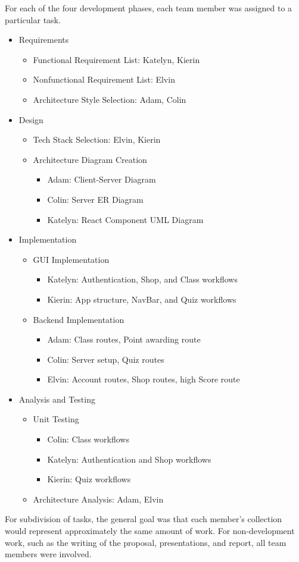 For each of the four development phases, each team member was assigned to a  particular task.

\begin{itemize}
    \item Requirements
    \begin{itemize}
        \item Functional Requirement List: Katelyn, Kierin
        \item Nonfunctional Requirement List: Elvin
        \item Architecture Style Selection: Adam, Colin
    \end{itemize}
    \item Design
    \begin{itemize}
        \item Tech Stack Selection: Elvin, Kierin
        \item Architecture Diagram Creation
        \begin{itemize}
            \item Adam: Client-Server Diagram
            \item Colin: Server ER Diagram
            \item Katelyn: React Component UML Diagram
        \end{itemize}
    \end{itemize}
    \item Implementation
    \begin{itemize}
        \item GUI Implementation
         \begin{itemize}
            \item Katelyn: Authentication, Shop, and Class workflows
            \item Kierin: App structure, NavBar, and Quiz workflows
        \end{itemize}
        \item Backend Implementation
        \begin{itemize}
            \item Adam: Class routes, Point awarding route
            \item Colin: Server setup, Quiz routes
            \item Elvin: Account routes, Shop routes, high Score route
        \end{itemize}
    \end{itemize}
    \item Analysis and Testing
    \begin{itemize}
        \item Unit Testing
         \begin{itemize}
            \item Colin: Class workflows
            \item Katelyn: Authentication and Shop workflows
            \item Kierin: Quiz workflows
        \end{itemize}
        \item Architecture Analysis: Adam, Elvin
    \end{itemize}
\end{itemize}

For subdivision of tasks, the general goal was that each member's collection would represent approximately the same amount of work. For non-development work, such as the writing of the proposal, presentations, and report, all team members were involved.